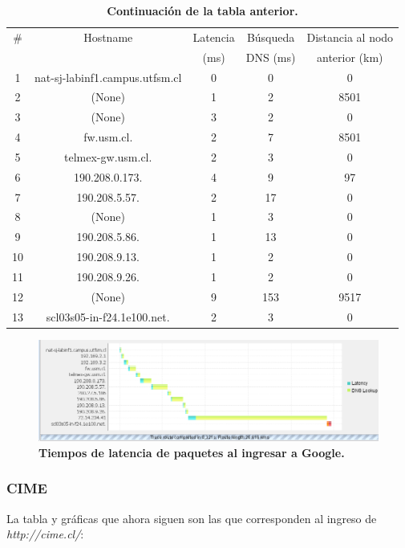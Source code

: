 \documentclass[12pt]{article}
\begin{document}
\begin{table}[H]
\centering
\begin{tabular}{| c | c | c | c | c |}
\hline
\# & Hostname & Latencia & Búsqueda & Distancia al nodo\\
 &  & (ms) & DNS (ms) & anterior (km)\\
\hline
1 & nat-sj-labinf1.campus.utfsm.cl & 0 & 0 & 0\\
\hline
2 & (None) & 1 & 2 & 8501\\
\hline
3 & (None) & 3 & 2 & 0\\
\hline
4 & fw.usm.cl. & 2 & 7 & 8501\\
\hline
5 & telmex-gw.usm.cl. & 2 & 3 & 0\\
\hline
6 & 190.208.0.173. & 4 & 9 & 97\\
\hline
7 & 190.208.5.57. & 2 & 17 & 0\\
\hline
8 & (None) & 1 & 3 & 0\\
\hline
9 & 190.208.5.86. & 1 & 13 & 0\\
\hline
10 & 190.208.9.13. & 1 & 2 & 0\\
\hline
11 & 190.208.9.26. & 1 & 2 & 0\\
\hline
12 & (None) & 9 & 153 & 9517\\
\hline
13 &  scl03s05-in-f24.1e100.net. & 2 & 3 & 0\\
\hline
\end{tabular}
\caption{\small \textbf{Continuación de la tabla anterior.}}
\end{table}

\begin{figure}[H] 
\centering 
\includegraphics[width=1\textwidth]{imagenes/google_grafica.png} \caption{\small \textbf{Tiempos de latencia de paquetes al ingresar a Google.}} 
\label{fig:diagrama_1} 
\end{figure}

\subsubsection{CIME}
La tabla y gráficas que ahora siguen son las que corresponden al ingreso de \emph{http://cime.cl/}:\\
\end{document}
